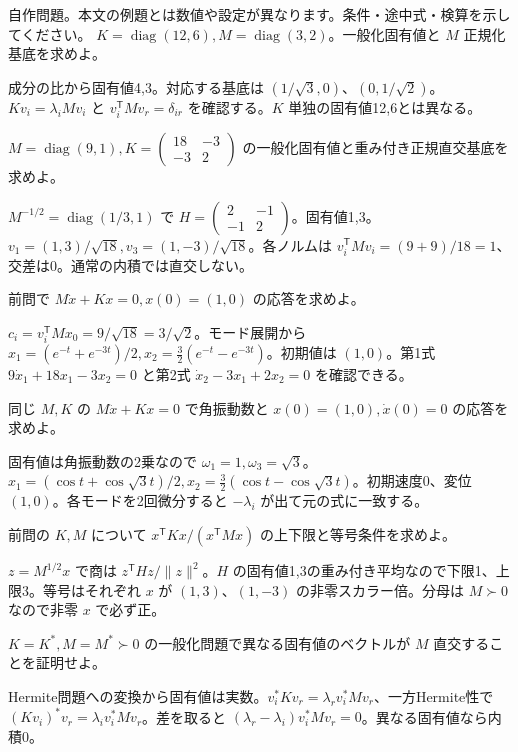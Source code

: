 \documentclass[11pt]{article}
\begin{document}
自作問題。本文の例題とは数値や設定が異なります。条件・途中式・検算を示してください。
\problem[対角の一般化問題]
$K=\operatorname{diag}(12,6),M=\operatorname{diag}(3,2)$。一般化固有値と $M$ 正規化基底を求めよ。
\begin{ans}
成分の比から固有値4,3。対応する基底は $(1/\sqrt3,0)$、$(0,1/\sqrt2)$。$Kv_i=\lambda_iMv_i$ と $v_i^{\mathsf T}Mv_r=\delta_{ir}$ を確認する。$K$ 単独の固有値12,6とは異なる。
\end{ans}
\problem[結合モード]
$M=\operatorname{diag}(9,1),K=\begin{pmatrix}18&-3\\-3&2\end{pmatrix}$ の一般化固有値と重み付き正規直交基底を求めよ。
\begin{ans}
$M^{-1/2}=\operatorname{diag}(1/3,1)$ で $H=\begin{pmatrix}2&-1\\-1&2\end{pmatrix}$。固有値1,3。$v_1=(1,3)/\sqrt{18},v_3=(1,-3)/\sqrt{18}$。各ノルムは $v_i^{\mathsf T}Mv_i=(9+9)/18=1$、交差は0。通常の内積では直交しない。
\end{ans}
\newpage
\problem[回路の時間応答]
前問で $M\dot x+Kx=0,x(0)=(1,0)$ の応答を求めよ。
\begin{ans}
$c_i=v_i^{\mathsf T}Mx_0=9/\sqrt{18}=3/\sqrt2$。モード展開から $x_1=(e^{-t}+e^{-3t})/2,x_2=\frac32(e^{-t}-e^{-3t})$。初期値は $(1,0)$。第1式 $9\dot x_1+18x_1-3x_2=0$ と第2式 $\dot x_2-3x_1+2x_2=0$ を確認できる。
\end{ans}
\problem[振動との違い]
同じ $M,K$ の $M\ddot x+Kx=0$ で角振動数と $x(0)=(1,0),\dot x(0)=0$ の応答を求めよ。
\begin{ans}
固有値は角振動数の2乗なので $\omega_1=1,\omega_3=\sqrt3$。$x_1=(\cos t+\cos\sqrt3t)/2,x_2=\frac32(\cos t-\cos\sqrt3t)$。初期速度0、変位 $(1,0)$。各モードを2回微分すると $-\lambda_i$ が出て元の式に一致する。
\end{ans}
\newpage
\problem[一般化Rayleigh商]
前問の $K,M$ について $x^{\mathsf T}Kx/(x^{\mathsf T}Mx)$ の上下限と等号条件を求めよ。
\begin{ans}
$z=M^{1/2}x$ で商は $z^{\mathsf T}Hz/\|z\|^2$。$H$ の固有値1,3の重み付き平均なので下限1、上限3。等号はそれぞれ $x$ が $(1,3)$、$(1,-3)$ の非零スカラー倍。分母は $M\succ0$ なので非零 $x$ で必ず正。
\end{ans}
\problem[重み付き直交の証明]
$K=K^*,M=M^*\succ0$ の一般化問題で異なる固有値のベクトルが $M$ 直交することを証明せよ。
\begin{ans}
Hermite問題への変換から固有値は実数。$v_i^*Kv_r=\lambda_rv_i^*Mv_r$、一方Hermite性で $(Kv_i)^*v_r=\lambda_iv_i^*Mv_r$。差を取ると $(\lambda_r-\lambda_i)v_i^*Mv_r=0$。異なる固有値なら内積0。
\end{ans}
\end{document}
